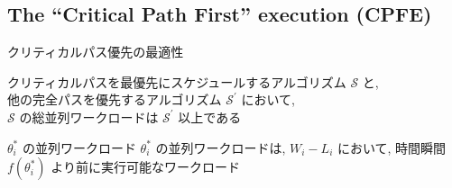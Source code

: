 

\subsection{The “Critical Path First” execution (CPFE)}
\label{ssec: CPFE}


\begin{frame}[label=theorem1]{クリティカルパス優先の最適性}
    \begin{theorem}[]
        クリティカルパスを最優先にスケジュールするアルゴリズム $\mathcal{S}$ と, \\他の完全パスを優先するアルゴリズム $\mathcal{S}^{\prime}$ において, \\$\mathcal{S}$ の総並列ワークロードは $\mathcal{S}^{\prime}$ 以上である
    \end{theorem}

    \begin{block}{$\theta_{i}^{*}$ の並列ワークロード}
        $\theta_{i}^{*}$ の並列ワークロードは, $W_{i}-L_{i}$ において, 時間瞬間 $f\left(\theta_{i}^{*}\right)$ より前に実行可能なワークロード
    \end{block}
\end{frame}

